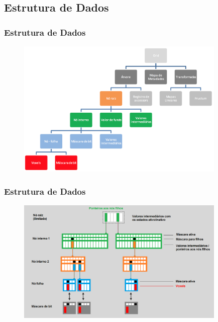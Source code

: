 \documentclass{beamer}
\begin{document}
\subsection{Estrutura de Dados}
\begin{frame}

\frametitle{Estrutura de Dados}

\begin{figure}[!htb]
\center
\includegraphics[width=10cm]{tree_structure}  
\end{figure}

\end{frame}

\begin{frame}

\frametitle{Estrutura de Dados}

\begin{figure}[!htb]
\center
\includegraphics[width=10cm]{tree_inverted}  
\end{figure}

\end{frame}

\end{document}
